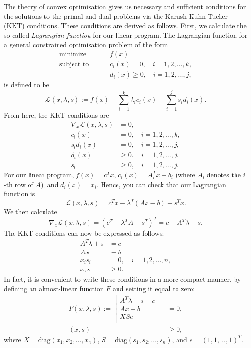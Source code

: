 The theory of convex optimization gives us necessary and sufficient
conditions for the solutions to the primal and dual problems via the Karush-Kuhn-Tucker (KKT) conditions.
These conditions are derived as follows. First, we calculate the so-called \emph{Lagrangian function} for our linear program.
The Lagrangian function for a general constrained optimization problem of the form
\begin{align*}
\text{minimize }\qquad &f(x)\\
\text{subject to }\qquad &c_i(x) = 0, \quad i = 1,2,\ldots,k,\\
&d_i(x) \geq 0, \quad i = 1,2,\ldots,j,
\end{align*}
is defined to be
\[
\mathcal{L}(x, \lambda, s) := f(x) - \displaystyle\sum_{i=1}^k\lambda_ic_i(x) - \displaystyle\sum_{i=1}^js_id_i(x).
\]
From here, the KKT conditions are
\begin{align*}
\nabla_x\mathcal{L}(x,\lambda,s) &= 0,\\
c_i(x) &= 0,\quad i = 1,2,\ldots,k,\\
s_id_i(x) &= 0,\quad i=1,2,\ldots,j,\\
d_i(x) &\geq 0,\quad i=1,2,\ldots,j,\\
s_i &\geq 0,\quad i=1,2,\ldots,j.
\end{align*}
For our linear program, $f(x) = c^Tx$, $c_i(x) = A_i^Tx - b_i$ (where $A_i$ denotes the $i$-th row of $A$), and
$d_i(x) = x_i$. Hence, you can check that our Lagrangian function is
\[
\mathcal{L}(x,\lambda,s) = c^Tx - \lambda^T(Ax - b) - s^Tx.
\]
We then calculate
\[
\nabla_x\mathcal{L}(x,\lambda,s) = (c^T - \lambda^TA - s^T)^T = c - A^T\lambda - s.
\]
The KKT conditions can now be expressed as follows:
\begin{align*}
A^T\lambda + s &= c\\
Ax &= b\\
x_is_i &= 0, \quad i = 1,2,\ldots,n,\\
x, s &\geq 0.
\end{align*}
In fact, it is convenient to write these conditions in a more compact manner, by defining an almost-linear function
$F$ and setting it equal to zero:
\begin{align*}
F(x,\lambda,s) :=
\begin{bmatrix}
A^T\lambda + s - c\\
Ax - b\\
XSe\\
\end{bmatrix}
&= 0,\\
(x,s) &\geq 0,
\end{align*}
where $X = \text{diag}(x_1,x_2,\ldots,x_n)$, $S = \text{diag}(s_1,s_2,\ldots,s_n)$, and $e = (1,1,\ldots,1)^T$.

